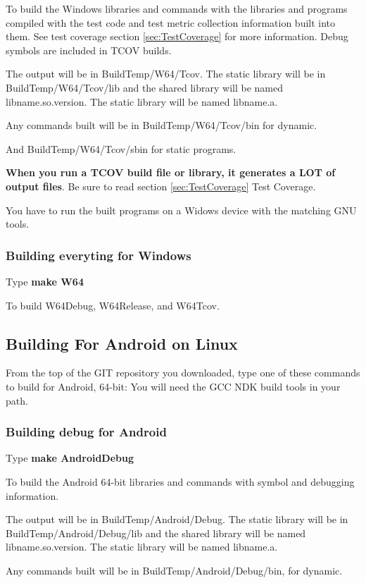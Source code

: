 To build the Windows libraries and commands with the libraries
and programs compiled with the test code and test metric
collection information built into them.
See test coverage section \ref{sec:TestCoverage} for more information.
Debug symbols are included in TCOV builds.

The output will be in BuildTemp/W64/Tcov.
The static library will be in BuildTemp/W64/Tcov/lib
and the shared library will be named lib{name}.so.{version}.
The static library will be named lib{name}.a.
  
Any commands built will be in BuildTemp/W64/Tcov/bin
for dynamic.

And BuildTemp/W64/Tcov/sbin for static programs.

\textbf{When you run a TCOV build file or library, it generates a LOT of  output files}. Be sure to read section \ref{sec:TestCoverage}{ Test Coverage}.
  
You have to run the built programs on a Widows device
with the matching GNU tools.
  
\subsubsection{Building everyting for Windows}
Type \textbf{make W64}

To build W64Debug, W64Release, and W64Tcov.

\subsection{Building For Android on Linux}
  
From the top of the GIT repository you downloaded,
type one of these commands to build for Android, 64-bit:
You will need the GCC NDK build tools in your path.

\subsubsection{Building debug for Android}
Type \textbf{make AndroidDebug}

To build the Android 64-bit libraries and commands with symbol
and debugging information.

The output will be in BuildTemp/Android/Debug.
The static library will be in BuildTemp/Android/Debug/lib
and the shared library will be named lib{name}.so.{version}.
The static library will be named lib{name}.a.
  
Any commands built will be in BuildTemp/Android/Debug/bin,
for dynamic.
  
